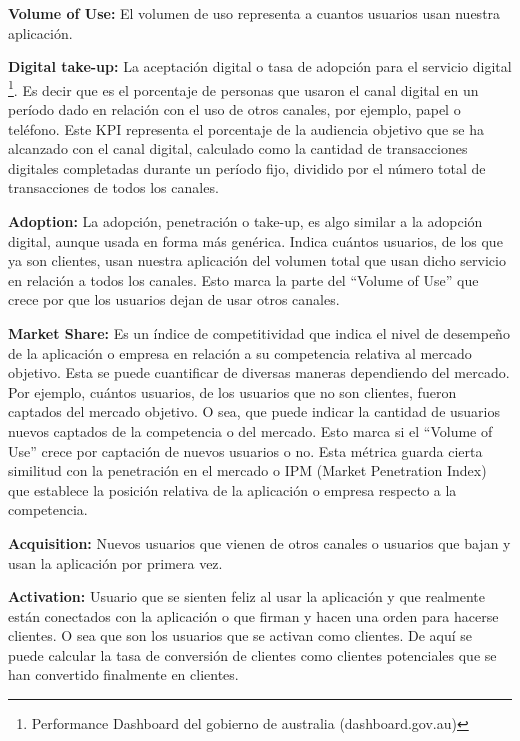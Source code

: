 \begin{description}
  \item {\textbf{Volume of Use:} El volumen de uso representa a cuantos usuarios usan nuestra aplicación.
}

  \item {\textbf{Digital take-up:} La aceptación digital o tasa de adopción para el servicio digital \footnote{Performance Dashboard del gobierno de australia (dashboard.gov.au)}. Es decir que es el porcentaje de personas que usaron el canal digital en un período dado en relación con el uso de otros canales, por ejemplo, papel o teléfono. Este KPI representa el porcentaje de la audiencia objetivo que se ha alcanzado con el canal digital, calculado como la cantidad de transacciones digitales completadas durante un período fijo, dividido por el número total de transacciones de todos los canales.
}

  \item {\textbf{Adoption:} La adopción, penetración o take-up, es algo similar a la adopción digital, aunque usada en forma más genérica. Indica cuántos usuarios, de los que ya son clientes, usan nuestra aplicación del volumen total que usan dicho servicio en relación a todos los canales. Esto marca la parte del “Volume of Use” que crece por que los usuarios dejan de usar otros canales.
}

  \item {\textbf{Market Share:} Es un índice de competitividad que indica el nivel de desempeño de la aplicación o empresa en relación a su competencia relativa al mercado objetivo. Esta se puede cuantificar de diversas maneras dependiendo del mercado. Por ejemplo, cuántos usuarios, de los usuarios que no son clientes, fueron captados del mercado objetivo. O sea, que puede indicar la cantidad de usuarios nuevos captados de la competencia o del mercado. Esto marca si el “Volume of Use” crece por captación de nuevos usuarios o no. Esta métrica guarda cierta similitud con la penetración en el mercado o IPM (Market Penetration Index) que establece la posición relativa de la aplicación o empresa respecto a la competencia.
}

  \item {\textbf{Acquisition:} Nuevos usuarios que vienen de otros canales o usuarios que bajan y usan la aplicación por primera vez.
}

  \item {\textbf{Activation:} Usuario que se sienten feliz al usar la aplicación y que realmente están conectados con la aplicación o que firman y hacen una orden para hacerse clientes. O sea que son los usuarios que se activan como clientes. De aquí se puede calcular la tasa de conversión de clientes como clientes potenciales que se han convertido finalmente en clientes.
}


\end{description}
